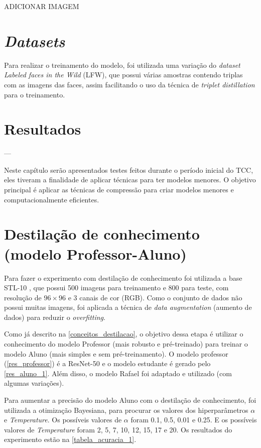 ADICIONAR IMAGEM

\section{\textit{Datasets}}\label{sec_datasets}
Para realizar o treinamento do modelo, foi utilizada uma variação do \textit{dataset}
\textit{Labeled faces in the Wild} (LFW), que possui várias amostras contendo triplas com as imagens das faces,
assim facilitando o uso da técnica de \textit{triplet distillation} para o treinamento.

\section{Resultados}\label{sec_resultados}

---

Neste capítulo serão apresentados testes feitos durante o período inicial do TCC, eles tiveram a finalidade de aplicar técnicas para ter modelos menores.
O objetivo principal é aplicar as técnicas de compressão para criar modelos menores e computacionalmente eficientes.

\section{Destilação de conhecimento (modelo Professor-Aluno)}
Para fazer o experimento com destilação de conhecimento foi utilizada a base STL-10 \cite{stl10}, que possui 500 imagens para
treinamento e 800 para teste, com resolução de $96 \times 96$ e 3 canais de cor (RGB). Como o conjunto de dados
não possui muitas imagens, foi aplicada a técnica de \textit{data augmentation} (aumento de dados) para reduzir o
\textit{overfitting}.

Como já descrito na \autoref{conceitos_destilacao}, o objetivo dessa etapa é utilizar o conhecimento do modelo
Professor (mais robusto e pré-treinado) para treinar o modelo Aluno (mais simples e sem pré-treinamento).
O modelo professor (\autoref{res_professor}) é a ResNet-50  \cite{resnet} e o modelo estudante é gerado pelo
\autoref{res_aluno_1}.
Além disso, o modelo Rafael \cite{rafael} foi adaptado e utilizado (com algumas variações).

Para aumentar a precisão do modelo Aluno com o destilação de conhecimento, foi utilizada a otimização
Bayesiana, para procurar os valores dos hiperparâmetros $\alpha$ e \textit{Temperature}.
Os possíveis valores de $\alpha$ foram 0.1, 0.5, 0.01 e 0.25.
E os possíveis valores de \textit{Temperature} foram 2, 5, 7, 10, 12, 15, 17 e 20.
Os resultados do experimento estão na \autoref{tabela_acuracia_1}.

